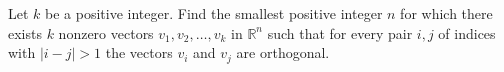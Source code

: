 Let \(k\) be a positive integer. Find the smallest positive integer \(n\) for which there exists \(k\) nonzero vectors \(v_1,v_2,\ldots,v_k\) in \(\mathbb{R}^n\) such that for every pair \(i,j\) of indices with \(|i-j|>1\) the vectors \(v_i\) and \(v_j\) are orthogonal.


